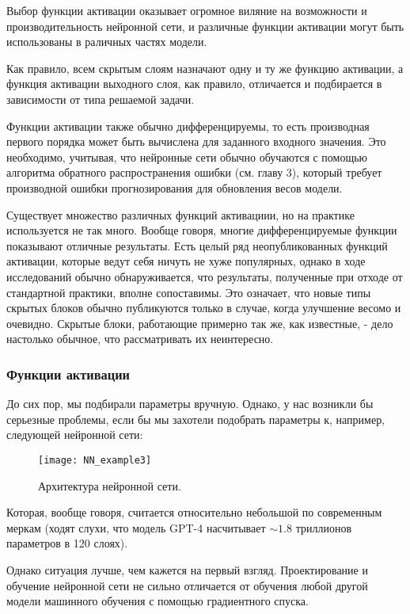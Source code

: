Выбор функции активации оказывает огромное виляние на возможности и производительность 
нейронной сети, и различные функции активации могут быть использованы в раличных частях модели.

Как правило, всем скрытым слоям назначают одну и ту же функцию активации, 
а функция активации выходного слоя, как правило, отличается и подбирается в 
зависимости от типа решаемой задачи.

Функции активации также обычно дифференцируемы, то есть производная первого порядка 
может быть вычислена для заданного входного значения. Это необходимо, учитывая, что 
нейронные сети обычно обучаются с помощью алгоритма обратного распространения ошибки 
(см. главу 3), 
который требует производной ошибки прогнозирования для обновления весов модели.

Существует множество различных функций активациии, но на практике используется не 
так много. Вообще говоря, многие дифференцируемые функции показывают отличные результаты. 
Есть целый ряд неопубликованных функций активации, которые ведут
себя ничуть не хуже популярных, однако в ходе исследований обычно 
обнаруживается, что результаты, полученные при отходе от стандартной практики, 
вполне сопоставимы. Это означает, что новые типы скрытых блоков
обычно публикуются только в случае, когда улучшение весомо и очевидно. Скрытые
блоки, работающие примерно так же, как известные, - дело настолько обычное, что
рассматривать их неинтересно.

\subsubsection{Функции активации}

До сих пор, мы подбирали параметры вручную. Однако, у нас возникли бы серьезные 
проблемы, если бы мы захотели подобрать параметры к, например, следующей нейронной сети:

\begin{figure}[h!]
    \centering
    \texttt{[image: NN\_example3]}
    \caption{Архитектура нейронной сети.}
    \label{fig:NN3}
\end{figure}

Которая, вообще говоря, считается относительно небольшой по современным меркам 
(ходят слухи, что модель GPT-4 насчитывает $\sim 1.8$ триллионов параметров в 
120 слоях).

Однако ситуация лучше, чем кажется на первый взгляд. 
Проектирование и обучение нейронной сети не сильно отличается от обучения 
любой другой модели машинного обучения с помощью градиентного спуска. 

